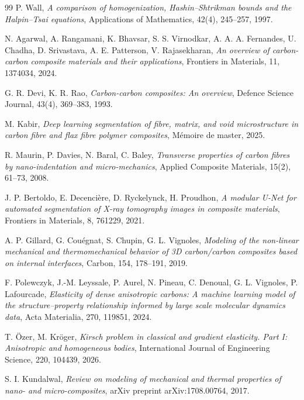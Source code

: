 \documentclass[a4paper,11pt]{article}
\begin{document}
\begin{thebibliography}{99}
P. Wall,
\textit{A comparison of homogenization, Hashin--Shtrikman bounds and the Halpin--Tsai equations},
Applications of Mathematics, 42(4), 245--257, 1997.

N. Agarwal, A. Rangamani, K. Bhavsar, S. S. Virnodkar, A. A. A. Fernandes, U. Chadha, D. Srivastava, A. E. Patterson, V. Rajasekharan,
\textit{An overview of carbon-carbon composite materials and their applications},
Frontiers in Materials, 11, 1374034, 2024.

G. R. Devi, K. R. Rao,
\textit{Carbon-carbon composites: An overview},
Defence Science Journal, 43(4), 369--383, 1993.

M. Kabir,
\textit{Deep learning segmentation of fibre, matrix, and void microstructure in carbon fibre and flax fibre polymer composites},
Mémoire de master, 2025.

R. Maurin, P. Davies, N. Baral, C. Baley,
\textit{Transverse properties of carbon fibres by nano-indentation and micro-mechanics},
Applied Composite Materials, 15(2), 61--73, 2008.

J. P. Bertoldo, E. Decencière, D. Ryckelynck, H. Proudhon,
\textit{A modular U-Net for automated segmentation of X-ray tomography images in composite materials},
Frontiers in Materials, 8, 761229, 2021.

A. P. Gillard, G. Couégnat, S. Chupin, G. L. Vignoles,
\textit{Modeling of the non-linear mechanical and thermomechanical behavior of 3D carbon/carbon composites based on internal interfaces},
Carbon, 154, 178--191, 2019.

F. Polewczyk, J.-M. Leyssale, P. Aurel, N. Pineau, C. Denoual, G. L. Vignoles, P. Lafourcade,
\textit{Elasticity of dense anisotropic carbons: A machine learning model of the structure--property relationship informed by large scale molecular dynamics data},
Acta Materialia, 270, 119851, 2024.

T. Özer, M. Kröger,
\textit{Kirsch problem in classical and gradient elasticity. Part I: Anisotropic and homogeneous bodies},
International Journal of Engineering Science, 220, 104439, 2026.

S. I. Kundalwal,
\textit{Review on modeling of mechanical and thermal properties of nano- and micro-composites},
arXiv preprint arXiv:1708.00764, 2017.

\end{thebibliography}
\end{document}
